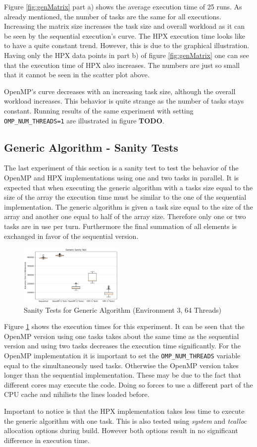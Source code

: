 Figure \ref{fig:genMatrix} part a) shows the average execution time of 25 runs.
As already mentioned, the number of tasks are the same for all executions.
Increasing the matrix size increases the task size and overall workload as it can be seen by the sequential execution's curve.
The HPX execution time looks like to have a quite constant trend.
However, this is due to the graphical illustration.
Having only the HPX data points in part b) of figure \ref{fig:genMatrix} one can see that the execution time of HPX also increases.
The numbers are just so small that it cannot be seen in the scatter plot above.

OpenMP's curve decreases with an increasing task size, although the overall workload increases.
This behavior is quite strange as the number of tasks stays constant.
Running results of the same experiment with setting \texttt{OMP\_NUM\_THREADS=1} are illustrated in figure \textbf{TODO}.



\subsection{Generic Algorithm - Sanity Tests}
The last experiment of this section is a sanity test to test the behavior of the OpenMP and HPX implementations using one and two tasks in parallel.
It is expected that when executing the generic algorithm with a tasks size equal to the size of the array the execution time must be similar to the one of the sequential implementation.
The generic algorithm is given a task size equal to the size of the array and another one equal to half of the array size.
Therefore only one or two tasks are in use per turn.
Furthermore the final summation of all elements is exchanged in favor of the sequential version.
\begin{figure}[h]
	\centering
	\includegraphics[width=0.45\textwidth]{figures/sanity.jpg}
	\caption{Sanity Tests for Generic Algorithm (Environment 3, 64 Threads)}
	\label{fig:sanity}
\end{figure}

Figure \ref{fig:sanity} shows the execution times for this experiment.
It can be seen that the OpenMP version using one tasks takes about the same time as the sequential version and using two tasks decreases the execution time significantly.
For the OpenMP implementation it is important to set the \texttt{OMP\_NUM\_THREADS} variable equal to the simultaneously used tasks.
Otherwise the OpenMP version takes longer than the sequential implementation.
These may be due to the fact that different cores may execute the code.
Doing so forces to use a different part of the CPU cache and nihilists the lines loaded before.

Important to notice is that the HPX implementation takes less time to execute the generic algorithm with one task.
This is also tested using \textit{system} and \textit{tcalloc} allocation options during build.
However both options result in no significant difference in execution time.
